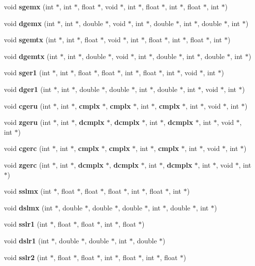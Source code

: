 \begin{CompactItemize}
void {\bf sgemx} (int $\ast$, int $\ast$, float $\ast$, void $\ast$, int $\ast$, float $\ast$, int $\ast$, float $\ast$, int $\ast$)
\item 
void {\bf dgemx} (int $\ast$, int $\ast$, double $\ast$, void $\ast$, int $\ast$, double $\ast$, int $\ast$, double $\ast$, int $\ast$)
\item 
void {\bf sgemtx} (int $\ast$, int $\ast$, float $\ast$, void $\ast$, int $\ast$, float $\ast$, int $\ast$, float $\ast$, int $\ast$)
\item 
void {\bf dgemtx} (int $\ast$, int $\ast$, double $\ast$, void $\ast$, int $\ast$, double $\ast$, int $\ast$, double $\ast$, int $\ast$)
\item 
void {\bf sger1} (int $\ast$, int $\ast$, float $\ast$, float $\ast$, int $\ast$, float $\ast$, int $\ast$, void $\ast$, int $\ast$)
\item 
void {\bf dger1} (int $\ast$, int $\ast$, double $\ast$, double $\ast$, int $\ast$, double $\ast$, int $\ast$, void $\ast$, int $\ast$)
\item 
void {\bf cgeru} (int $\ast$, int $\ast$, {\bf cmplx} $\ast$, {\bf cmplx} $\ast$, int $\ast$, {\bf cmplx} $\ast$, int $\ast$, void $\ast$, int $\ast$)
\item 
void {\bf zgeru} (int $\ast$, int $\ast$, {\bf dcmplx} $\ast$, {\bf dcmplx} $\ast$, int $\ast$, {\bf dcmplx} $\ast$, int $\ast$, void $\ast$, int $\ast$)
\item 
void {\bf cgerc} (int $\ast$, int $\ast$, {\bf cmplx} $\ast$, {\bf cmplx} $\ast$, int $\ast$, {\bf cmplx} $\ast$, int $\ast$, void $\ast$, int $\ast$)
\item 
void {\bf zgerc} (int $\ast$, int $\ast$, {\bf dcmplx} $\ast$, {\bf dcmplx} $\ast$, int $\ast$, {\bf dcmplx} $\ast$, int $\ast$, void $\ast$, int $\ast$)
\item 
void {\bf sslmx} (int $\ast$, float $\ast$, float $\ast$, float $\ast$, int $\ast$, float $\ast$, int $\ast$)
\item 
void {\bf dslmx} (int $\ast$, double $\ast$, double $\ast$, double $\ast$, int $\ast$, double $\ast$, int $\ast$)
\item 
void {\bf sslr1} (int $\ast$, float $\ast$, float $\ast$, int $\ast$, float $\ast$)
\item 
void {\bf dslr1} (int $\ast$, double $\ast$, double $\ast$, int $\ast$, double $\ast$)
\item 
void {\bf sslr2} (int $\ast$, float $\ast$, float $\ast$, int $\ast$, float $\ast$, int $\ast$, float $\ast$)
\item 

\end{CompactItemize}

